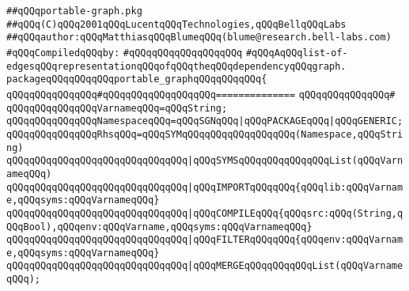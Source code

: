 \label{src/app/makelib/portable-graph/portable-graph.pkg}
\verb|##qQQqportable-graph.pkg|\newline
\verb|##qQQq(C)qQQq2001qQQqLucentqQQqTechnologies,qQQqBellqQQqLabs|\newline
\verb|##qQQqauthor:qQQqMatthiasqQQqBlumeqQQq(blume@research.bell-labs.com)|\newline
\newline
\verb|#qQQqCompiledqQQqby:|\newline
\verb|#qQQqqQQqqQQqqQQqqQQq|\newline
\newline
\newline
\newline
\verb|#qQQqAqQQqlist-of-edgesqQQqrepresentationqQQqofqQQqtheqQQqdependencyqQQqgraph.|\newline
\newline
\newline
\newline
\verb|packageqQQqqQQqqQQqportable_graphqQQqqQQqqQQq{|\newline
\verb|qQQqqQQqqQQqqQQq#qQQqqQQqqQQqqQQqqQQq==============|\newline
\verb|qQQqqQQqqQQqqQQq#|\newline
\verb|qQQqqQQqqQQqqQQqVarnameqQQq=qQQqString;|\newline
\newline
\verb|qQQqqQQqqQQqqQQqNamespaceqQQq=qQQqSGNqQQq|\verb#|qQQqPACKAGEqQQq|qQQqGENERIC;#\newline
\newline
\verb|qQQqqQQqqQQqqQQqRhsqQQq=qQQqSYMqQQqqQQqqQQqqQQqqQQq(Namespace,qQQqString)|\newline
\verb|qQQqqQQqqQQqqQQqqQQqqQQqqQQqqQQq|\verb#|qQQqSYMSqQQqqQQqqQQqqQQqList(qQQqVarnameqQQq)#\newline
\verb|qQQqqQQqqQQqqQQqqQQqqQQqqQQqqQQq|\verb#|qQQqIMPORTqQQqqQQq{qQQqlib:qQQqVarname,qQQqsyms:qQQqVarnameqQQq}#\newline
\verb|qQQqqQQqqQQqqQQqqQQqqQQqqQQqqQQq|\verb#|qQQqCOMPILEqQQq{qQQqsrc:qQQq(String,qQQqBool),qQQqenv:qQQqVarname,qQQqsyms:qQQqVarnameqQQq}#\newline
\verb|qQQqqQQqqQQqqQQqqQQqqQQqqQQqqQQq|\verb#|qQQqFILTERqQQqqQQq{qQQqenv:qQQqVarname,qQQqsyms:qQQqVarnameqQQq}#\newline
\verb|qQQqqQQqqQQqqQQqqQQqqQQqqQQqqQQq|\verb#|qQQqMERGEqQQqqQQqqQQqList(qQQqVarnameqQQq);#\newline

